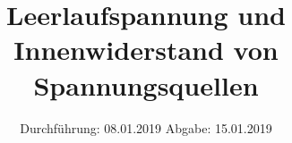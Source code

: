 

\subject{V301}
\title{Leerlaufspannung und Innenwiderstand von Spannungsquellen}
\date{%
  Durchführung: 08.01.2019
  \hspace{3em}
  Abgabe: 15.01.2019
}



\maketitle
\thispagestyle{empty}
\tableofcontents
\newpage






\printbibliography{}


